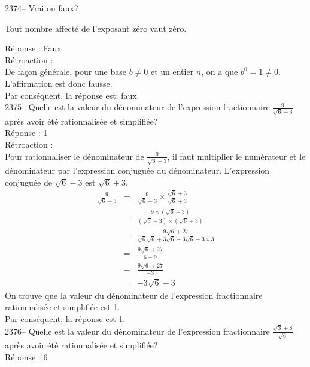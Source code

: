 \documentclass[letterpaper, 12pt]{article}
\begin{document}
2374-- Vrai ou faux?
\begin{center}
 Tout nombre affect\'e de l'exposant z\'ero vaut z\'ero.\\
\end{center}

R\'eponse : Faux\\

R\'etroaction :\\
De fa\c con g\'en\'erale, pour une base $b\neq0$ et un entier $n$,
on a que $b^{0}=1\neq0$. L'affirmation est donc fausse. \\
Par cons\'equent, la r\'eponse est: faux.\\

2375-- Quelle est la valeur du d\'enominateur de l'expression fractionnaire $\frac{9}{\sqrt{6}-3}$ apr\`es avoir \'et\'e rationnalis\'ee et simplifi\'ee?\\

R\'eponse : 1\\

R\'etroaction :\\
Pour rationnaliser le d\'enominateur de $\frac{9}{\sqrt{6}-3}$, il faut multiplier le num\'erateur et le d\'enominateur par l'expression conjugu\'ee du d\'enominateur. L'expression conjugu\'ee de $\sqrt{6}-3$ est $\sqrt{6}+3$.
\begin{eqnarray*}
\frac{9}{\sqrt{6}-3}&=&\frac{9}{\sqrt{6}-3}\times\frac{\sqrt{6}+3}{\sqrt{6}+3}\\[2mm]
&=&\frac{9\times(\sqrt{6}+3)}{(\sqrt{6}-3)\times(\sqrt{6}+3)}\\[2mm]
&=&\frac{9\sqrt{6}+27}{\sqrt{6}\sqrt{6}+3\sqrt{6}-3\sqrt{6}-3\times3}\\[2mm]
&=&\frac{9\sqrt{6}+27}{6-9}\\[2mm]
&=&\frac{9\sqrt{6}+27}{-3}\\[2mm]
&=&-3\sqrt{6}-3
\end{eqnarray*}
On trouve que la valeur du d\'enominateur de l'expression fractionnaire rationnalis\'ee et simplifi\'ee est 1.\\
Par cons\'equent, la r\'eponse est 1.\\

2376-- Quelle est la valeur du d\'enominateur de l'expression fractionnaire $\frac{\sqrt{3}+8}{\sqrt{6}}$ apr\`es avoir \'et\'e rationnalis\'ee et simplifi\'ee?\\

R\'eponse : 6\\
\end{document}
